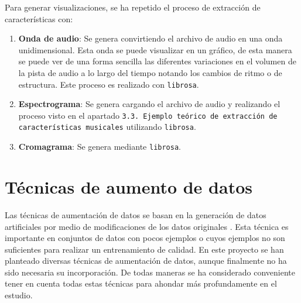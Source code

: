 Para generar visualizaciones, se ha repetido el proceso de extracción de características con:

\begin{enumerate}
\tightlist
\item \textbf{Onda de audio}: Se genera convirtiendo el archivo de audio en una onda unidimensional. Esta onda se puede visualizar en un gráfico, de esta manera se puede ver de una forma sencilla las diferentes variaciones en el volumen de la pista de audio a lo largo del tiempo notando los cambios de ritmo o de estructura. Este proceso es realizado con \texttt{librosa}.

\item \textbf{Espectrograma}: Se genera cargando el archivo de audio y realizando el proceso visto en el apartado \texttt{3.3. Ejemplo teórico de extracción de características musicales} utilizando \texttt{librosa}.

\item \textbf{Cromagrama}: Se genera mediante \texttt{librosa}.
\end{enumerate}

\newpage

\section{Técnicas de aumento de datos}

Las técnicas de aumentación de datos se basan en la generación de datos artificiales por medio de modificaciones de los datos originales \cite{PIERGALLINI_2023}. Esta técnica es importante en conjuntos de datos con pocos ejemplos o cuyos ejemplos no son suficientes para realizar un entrenamiento de calidad.
En este proyecto se han planteado diversas técnicas de aumentación de datos, aunque finalmente no ha sido necesaria su incorporación. De todas maneras se ha considerado conveniente tener en cuenta todas estas técnicas para ahondar más profundamente en el estudio.

